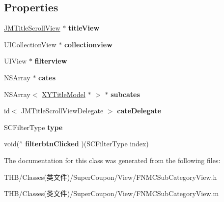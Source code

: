 \subsection*{Properties}
\begin{DoxyCompactItemize}
\item 
\mbox{\label{interface_f_n_m_c_sub_category_view_a8fea8afe64ff05d0ac8584e6ebc71f85}} 
\mbox{\hyperlink{interface_j_m_title_scroll_view}{J\+M\+Title\+Scroll\+View}} $\ast$ {\bfseries title\+View}
\item 
\mbox{\label{interface_f_n_m_c_sub_category_view_a9e4e20c3744ab7aa2b4e08589aee6533}} 
U\+I\+Collection\+View $\ast$ {\bfseries collectionview}
\item 
\mbox{\label{interface_f_n_m_c_sub_category_view_a656d06fc8b6ff384414fa61b486c01d7}} 
U\+I\+View $\ast$ {\bfseries filterview}
\item 
\mbox{\label{interface_f_n_m_c_sub_category_view_ade861734e47766594cf86ec656f5cb13}} 
N\+S\+Array $\ast$ {\bfseries cates}
\item 
\mbox{\label{interface_f_n_m_c_sub_category_view_acba292044ecee4328256f1dd35025075}} 
N\+S\+Array$<$ \mbox{\hyperlink{interface_x_y_title_model}{X\+Y\+Title\+Model}} $\ast$ $>$ $\ast$ {\bfseries subcates}
\item 
\mbox{\label{interface_f_n_m_c_sub_category_view_a097916bbcc6ce5bece6145503f1a374e}} 
id$<$ J\+M\+Title\+Scroll\+View\+Delegate $>$ {\bfseries cate\+Delegate}
\item 
\mbox{\label{interface_f_n_m_c_sub_category_view_a402cfa11db11f4d17bce18eb7ca9304a}} 
S\+C\+Filter\+Type {\bfseries type}
\item 
\mbox{\label{interface_f_n_m_c_sub_category_view_a8e8f07368ab537968b498e3c388a4b67}} 
void($^\wedge$ {\bfseries filterbtn\+Clicked} )(S\+C\+Filter\+Type index)
\end{DoxyCompactItemize}


The documentation for this class was generated from the following files\+:\begin{DoxyCompactItemize}
\item 
T\+H\+B/\+Classes(类文件)/\+Super\+Coupon/\+View/F\+N\+M\+C\+Sub\+Category\+View.\+h\item 
T\+H\+B/\+Classes(类文件)/\+Super\+Coupon/\+View/F\+N\+M\+C\+Sub\+Category\+View.\+m\end{DoxyCompactItemize}
